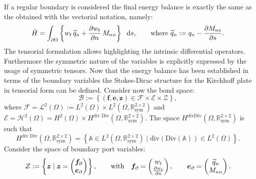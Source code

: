 \documentclass[preprint,12pt]{elsarticle}
\newcommand{\revOne}[1]{\textcolor{blue!80!black}{#1}}
\begin{document}
If a regular boundary is considered the final energy balance is exactly the same as the obtained with the vectorial notation, namely:
\begin{equation}
\dot{H} = \int_{\partial \Omega} \left\{ w_t \, \widetilde{q}_n + \diffp{w_t}{n} \, M_{nn}\right\} \ \d{s},  \qquad \text{where }\widetilde{q}_n := q_n - \diffp{M_{ns}}{s}.
\end{equation} 
The tensorial formulation allows highlighting the intrinsic differential operators. Furthermore the symmetric nature of the variables is explicitly expressed by the usage of symmetric tensors. \revOne{Now that the energy balance has been established in terms of the boundary variables the Stokes-Dirac structure for the Kirchhoff plate in tensorial form can be defined. Consider now the bond space:
\begin{equation}
\label{eq:bondKir}
\mathcal{B} := \left\{(\bm{f}, \bm{e}, \bm{z}) \in \mathcal{F} \times \mathcal{E} \times \mathcal{Z} \right\},
\end{equation}
where $\mathcal{F}=  \mathscr{L}^2(\Omega) :=  L^2(\Omega) \times L^2(\Omega, \mathbb{R}^{2 \times 2}_{\text{sym}})$ and $ \mathcal{E} =  \mathscr{H}^2(\Omega) = H^{2}(\Omega) \times H^{\text{div Div}}(\Omega, \mathbb{R}^{2 \times 2}_{\text{sym}})$. The space $H^{\text{divDiv}}(\Omega, \mathbb{R}^{2 \times 2}_{\text{sym}})$ is such that
\[
H^{\text{div Div}}(\Omega, \mathbb{R}^{2 \times 2}_{\text{sym}}) = \left\{ \mathbb{A} \in L^2(\Omega, \mathbb{R}^{2 \times 2}_{\text{sym}}) \; \vert \; \mathrm{div}(\mathrm{Div}(\mathbb{A})) \in L^2(\Omega) \right\}.
\] Consider the space of boundary port variables:
\begin{equation}
\begin{gathered}
\mathcal{Z} := \left\{ \bm{z} \; \vert \; \bm{z} = \begin{pmatrix} \bm{f}_{\partial} \\ \bm{e}_{\partial} \end{pmatrix} \right\}, \qquad \text{with} \quad
\bm{f}_\partial = 
\begin{pmatrix}
w_t \\ \diffp{w_t}{n} \\
\end{pmatrix}, \qquad
\bm{e}_\partial = 
\begin{pmatrix}
\widetilde{q}_n \\ M_{nn} \\
\end{pmatrix}.
\end{gathered}
\end{equation}
}
\end{document}
